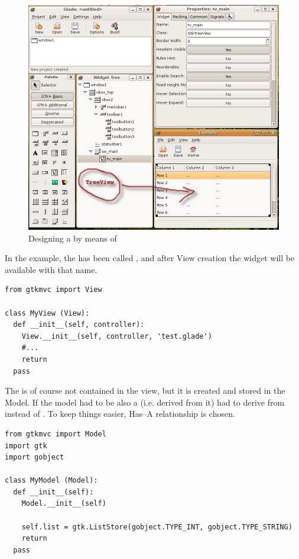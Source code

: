\begin{figure}[here]
\begin{center}
\includegraphics[width=12cm]{figs/png/treeview}
\caption{\label{fig:VR}Designing a  by means of \glade }
\end{center}
\end{figure}

In the example, the  has been called
, and after View creation the widget will be
available with that name.

{ \codesize 
\begin{verbatim}
from gtkmvc import View

class MyView (View):
  def __init__(self, controller):
    View.__init__(self, controller, 'test.glade')
    #...
    return
  pass 
\end{verbatim}
}

The  is of course not contained in the view, but
it is created and stored in the Model. If the model had to be also a
 (i.e.  derived from it)  had to
derive from  instead of
. To keep things easier, Has--A relationship is
chosen.

{ \codesize 
\begin{verbatim}
from gtkmvc import Model
import gtk
import gobject

class MyModel (Model):
  def __init__(self):
    Model.__init__(self)

    self.list = gtk.ListStore(gobject.TYPE_INT, gobject.TYPE_STRING)
    return
  pass 
\end{verbatim}
}

